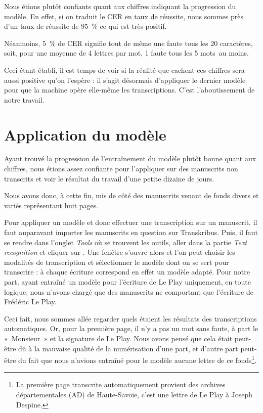 Nous étions plutôt confiants quant aux chiffres indiquant la progression du modèle. 
En effet, si on traduit le CER en taux de réussite, nous sommes près d'un taux de réussite de 95~\% ce qui est très positif. 

Néanmoins, 5 \% de CER signifie tout de même une faute tous les 20 caractères, soit, pour une moyenne de 4 lettres par mot, 1 faute tous les 5 mots au moins.

Ceci étant établi, il est temps de voir si la réalité que cachent ces chiffres sera aussi positive qu'on l'espère : il s'agit désormais d'appliquer le dernier modèle pour que la machine opère elle-même les transcriptions. C'est l'aboutissement de notre travail. 
 
 
\section{Application du modèle}

Ayant trouvé la progression de l’entraînement du modèle plutôt bonne quant aux chiffres, nous étions assez confiante pour l’appliquer sur des manuscrits non transcrits et voir le résultat du travail d’une petite dizaine de jours.

Nous avons donc, à cette fin, mis de côté des manuscrits venant de fonds divers et variés représentant huit pages.

Pour appliquer un modèle et donc effectuer une transcription sur un manuscrit, il faut auparavant importer les manuscrits en question sur Transkribus. Puis, il faut se rendre dans l'onglet \emph{Tools} où se trouvent les outils, aller dans la partie \emph{Text recognition} et cliquer sur . Une fenêtre s'ouvre alors et l'on peut choisir les modalités de transcription et sélectionner le modèle dont on se sert pour transcrire : à chaque écriture correspond en effet un modèle adapté. Pour notre part, ayant entraîné un modèle pour l'écriture de Le Play uniquement, en toute logique, nous n'avons chargé que des manuscrits ne comportant que l'écriture de Frédéric Le Play.

Ceci fait, nous sommes allée regarder quels étaient les résultats des transcriptions automatiques. Or, pour la première page, il n'y a pas un mot sans faute, à part le « Monsieur » et la signature de Le Play. Nous avons pensé que cela était peut-être dû à la mauvaise qualité de la numérisation d'une part, et d'autre part peut-être du fait que nous n'avions entraîné pour le modèle aucune lettre de ce fonds\footnote{La première page transcrite automatiquement provient des archives départementales (AD) de Haute-Savoie, c'est une lettre de Le Play à Joseph Despine.}.

